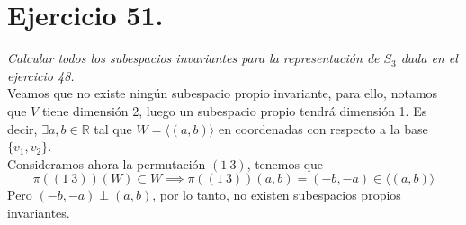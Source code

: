 \section{Ejercicio 51.} \emph{Calcular todos los subespacios invariantes para la representación de \(S_{3}\) dada en el ejercicio 48.}\\

Veamos que no existe ningún subespacio propio invariante, para ello, notamos que \(V\) tiene dimensión 2, luego un subespacio propio tendrá dimensión 1. Es decir, \(\exists a,b\in \mathbb{R}\) tal que \(W = \langle (a,b) \rangle\) en coordenadas con respecto a la base \(\{v_{1}, v_{2}\}\).\\

Consideramos ahora la permutación \((1 \ 3)\), tenemos que
\[
  \pi((1 \ 3))(W) \subset W \implies \pi((1 \ 3))(a, b) = (-b, -a) \in \langle (a, b) \rangle
\]
Pero \((-b,-a)\perp (a,b)\), por lo tanto, no existen subespacios propios invariantes.
